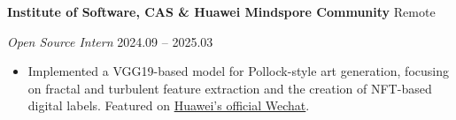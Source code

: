 \documentclass[11pt]{article}
\begin{document}
	\vspace{10pt}
	
	\textbf{Institute of Software, CAS \& Huawei Mindspore Community} \hfill Remote
	
	\textit{Open Source Intern} \hfill 2024.09 – 2025.03
	\begin{itemize}[noitemsep, topsep=0pt, partopsep=0pt, parsep=0pt, leftmargin=*]
		\item Implemented a VGG19-based model for Pollock-style art generation, focusing on fractal and turbulent feature extraction and the creation of NFT-based digital labels. Featured on \href{https://mp.weixin.qq.com/s/_N5oLsa0etJTxEOKRTt_4w}{Huawei's official Wechat}.
	\end{itemize}
	
	\vspace{10pt}
	
	\vspace{12pt}
	
\end{document}
